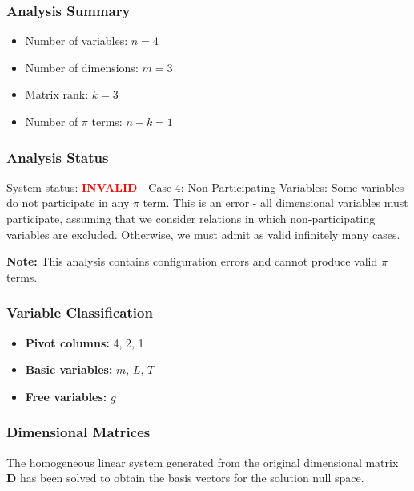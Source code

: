 \subsubsection*{Analysis Summary}
\begin{itemize}
\item Number of variables: $n = 4$
\item Number of dimensions: $m = 3$
\item Matrix rank: $k = 3$
\item Number of $\pi$ terms: $n - k = 1$
\end{itemize}

\subsubsection*{Analysis Status}
System status: \textcolor{red}{\textbf{INVALID}} - Case 4: Non-Participating Variables: Some variables do not participate in any $\pi$ term. This is an error - all dimensional variables must participate, assuming that we consider relations in which non-participating variables are excluded. Otherwise, we must admit as valid infinitely many cases.

\textbf{Note:} This analysis contains configuration errors and cannot produce valid $\pi$ terms.

\subsubsection*{Variable Classification}
\begin{itemize}
\item \textbf{Pivot columns:} 4, 2, 1
\item \textbf{Basic variables:} $m$, $L$, $T$
\item \textbf{Free variables:} $g$
\end{itemize}

\subsubsection*{Dimensional Matrices}
The homogeneous linear system generated from the original dimensional matrix $\mathbf{D}$ has been solved to obtain the basis vectors for the solution null space.

